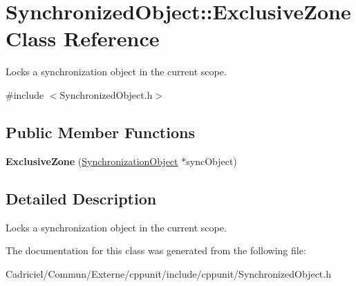 \hypertarget{class_synchronized_object_1_1_exclusive_zone}{\section{Synchronized\-Object\-:\-:Exclusive\-Zone Class Reference}
\label{class_synchronized_object_1_1_exclusive_zone}
}


Locks a synchronization object in the current scope.  




{\ttfamily \#include $<$Synchronized\-Object.\-h$>$}

\subsection*{Public Member Functions}
\begin{DoxyCompactItemize}
\item 
\hypertarget{class_synchronized_object_1_1_exclusive_zone_ae4393b508828328c2f4816ff9b7b090c}{{\bfseries Exclusive\-Zone} (\hyperlink{class_synchronized_object_1_1_synchronization_object}{Synchronization\-Object} $\ast$sync\-Object)}\label{class_synchronized_object_1_1_exclusive_zone_ae4393b508828328c2f4816ff9b7b090c}

\end{DoxyCompactItemize}


\subsection{Detailed Description}
Locks a synchronization object in the current scope. 

The documentation for this class was generated from the following file\-:\begin{DoxyCompactItemize}
\item 
Cadriciel/\-Commun/\-Externe/cppunit/include/cppunit/Synchronized\-Object.\-h\end{DoxyCompactItemize}
